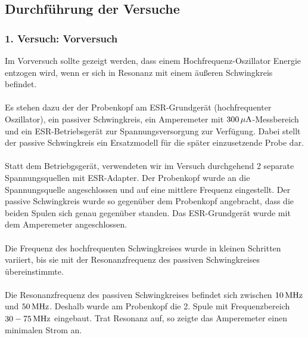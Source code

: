 \documentclass[a4paper,titlepage]{scrartcl}
\numberwithin{equation}{section}
\begin{document}
\subsection{Durchführung der Versuche}
\subsubsection{1. Versuch: Vorversuch}
Im Vorversuch sollte gezeigt werden, dass einem Hochfrequenz-Oszillator Energie entzogen wird, wenn er sich in Resonanz mit einem äußeren Schwingkreis befindet. \\ \\
Es stehen dazu der der Probenkopf am ESR-Grundgerät (hochfrequenter Oszillator), ein passiver Schwingkreis, ein Amperemeter mit $\unit[300]{\mu A}$-Messbereich und ein ESR-Betriebsgerät zur Spannungsversorgung zur Verfügung. Dabei stellt der passive Schwingkreis ein Ersatzmodell für die später einzusetzende Probe dar.\\ \\
Statt dem Betriebgsgerät, verwendeten wir im Versuch durchgehend 2 separate Spannungsquellen mit ESR-Adapter. Der Probenkopf wurde an die Spannungsquelle angeschlossen und auf eine mittlere Frequenz eingestellt. Der passive Schwingkreis wurde so gegenüber dem Probenkopf angebracht, dass die beiden Spulen sich genau gegenüber standen. Das ESR-Grundgerät wurde mit dem Amperemeter angeschlossen.\\ \\
Die Frequenz des hochfrequenten Schwingkreises wurde in kleinen Schritten variiert, bis sie mit der Resonanzfrequenz des passiven Schwingkreises übereinstimmte.\\ \\
Die Resonanzfrequenz des passiven Schwingkreises befindet sich zwischen $\unit[10]{MHz}$ und $\unit[50]{MHz}$. Deshalb wurde am Probenkopf die 2. Spule mit Frequenzbereich $\unit[30-75]{MHz}$ eingebaut. Trat Resonanz auf, so zeigte das Amperemeter einen minimalen Strom an.
\end{document}
